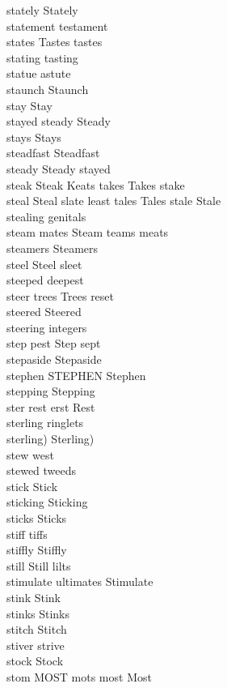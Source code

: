 stately Stately\\
statement testament\\
states Tastes tastes\\
stating tasting\\
statue astute\\
staunch Staunch\\
stay Stay\\
stayed steady Steady\\
stays Stays\\
steadfast Steadfast\\
steady Steady stayed\\
steak Steak Keats takes Takes stake\\
steal Steal slate least tales Tales stale Stale\\
stealing genitals\\
steam mates Steam teams meats\\
steamers Steamers\\
steel Steel sleet\\
steeped deepest\\
steer trees Trees reset\\
steered Steered\\
steering integers\\
step pest Step sept\\
stepaside Stepaside\\
stephen STEPHEN Stephen\\
stepping Stepping\\
ster rest erst Rest\\
sterling ringlets\\
sterling) Sterling)\\
stew west\\
stewed tweeds\\
stick Stick\\
sticking Sticking\\
sticks Sticks\\
stiff tiffs\\
stiffly Stiffly\\
still Still lilts\\
stimulate ultimates Stimulate\\
stink Stink\\
stinks Stinks\\
stitch Stitch\\
stiver strive\\
stock Stock\\
stom MOST mots most Most\\
